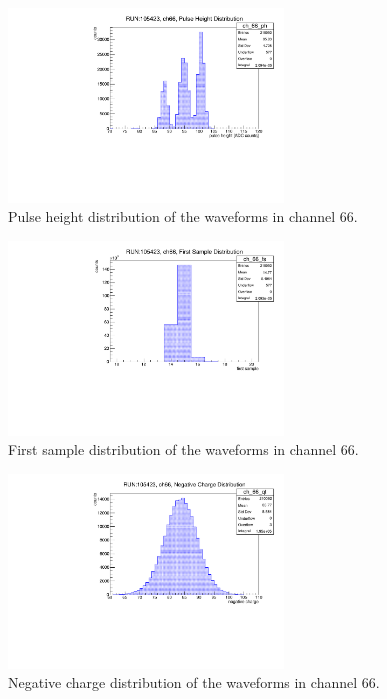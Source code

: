 \begin{figure}[!h]
  \centering
  \includegraphics[width=0.65\textwidth]{figures/pdf/pulseheight.pdf}
  \caption{Pulse height distribution of the waveforms in channel 66.}
  \label{fig:ph2}
\end{figure}

\begin{figure}[!h]
  \centering
  \includegraphics[width=0.65\textwidth]{figures/pdf/fs.pdf}
  \caption{First sample distribution of the waveforms in channel 66.}
  \label{fig:fs2}
\end{figure}

\begin{figure}[!h]
    \centering
    \includegraphics[width=0.65\textwidth]{figures/pdf/negcharge.pdf}
    \caption{Negative charge distribution of the waveforms in channel 66.}
    \label{fig:nch2}
\end{figure}
    
